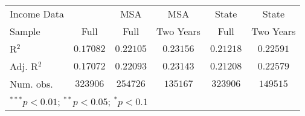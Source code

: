\begin{tabular}{l c c c c c}
Income Data           &                  & MSA              & MSA              & State            & State            \\
Sample                & Full             & Full             & Two Years        & Full             & Two Years        \\
R$^2$                 & $0.17082$        & $0.22105$        & $0.23156$        & $0.21218$        & $0.22591$        \\
Adj. R$^2$            & $0.17072$        & $0.22093$        & $0.23143$        & $0.21208$        & $0.22579$        \\
Num. obs.             & $323906$         & $254726$         & $135167$         & $323906$         & $149515$         \\
\hline
\multicolumn{6}{l}{\scriptsize{$^{***}p<0.01$; $^{**}p<0.05$; $^{*}p<0.1$}}
\end{tabular}
